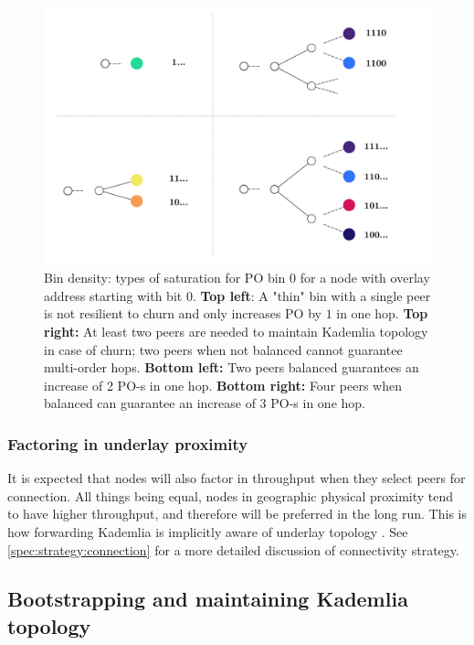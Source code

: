 \begin{figure}[htbp]
   \centering
   \includegraphics[width=\textwidth]{fig/bindensity.pdf}
   \caption[Bin density \statusgreen]{Bin density:  types of saturation for PO bin $0$ for a node with overlay address starting with bit $0$. \textbf{Top left}: A "thin" bin with a single peer is not resilient to churn and only increases PO by $1$ in one hop. \textbf{Top right:} At least two peers are needed to maintain Kademlia topology in case of churn; two peers when not balanced cannot guarantee multi-order hops. \textbf{Bottom left:} Two peers balanced guarantees an increase of 2 PO-s in one hop. \textbf{Bottom right:} Four peers when balanced can guarantee an increase of $3$ PO-s in one hop.}
   \label{fig:bindensity}
\end{figure}

\subsubsection{Factoring in underlay proximity}
It is expected that nodes will also factor in throughput when they select peers for connection. All things being equal, nodes in geographic physical proximity tend to have higher throughput, and therefore will be preferred in the long run. This is how forwarding Kademlia is implicitly aware of underlay topology \cite{heep2010r}. See \ref{spec:strategy:connection} for a more detailed discussion of connectivity strategy.


\subsection{Bootstrapping and maintaining Kademlia topology \statusgreen}\label{sec:bootstrapping}
 

